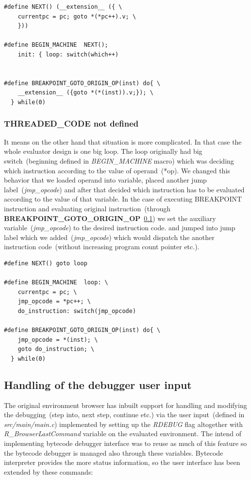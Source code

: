 \documentclass[thesis=M,english]{FITthesis}[2018/10/20]
\begin{document}
\begin{lstlisting}
#define NEXT() (__extension__ ({ \
    currentpc = pc; goto *(*pc++).v; \
    }))

#define BEGIN_MACHINE  NEXT(); 
    init: { loop: switch(which++)


#define BREAKPOINT_GOTO_ORIGIN_OP(inst) do{ \
    __extension__ ({goto *(*(inst)).v;}); \
  } while(0)
\end{lstlisting}


\subsubsection{THREADED{\_}CODE not defined}
It means on the other hand that situation is more complicated. In that case the whole evaluator design is one big loop. The loop originally had big switch~(beginning defined in \textit{BEGIN{\_}MACHINE} macro) which was deciding which instruction according to the value of operand~(*op). We changed this behavior that we loaded operand into variable, placed another jump label~(\textit{jmp{\_}opcode}) and after that decided which instruction has to be evaluated according to the value of that variable. In the case of executing BREAKPOINT instruction and evaluating original instruction~(through \textbf{BREAKPOINT{\_}GOTO{\_}ORIGIN{\_}OP}~\ref{}) we set the auxiliary variable~(\textit{jmp{\_}opcode}) to the desired instruction code.  and jumped into jump label which we added~(\textit{jmp{\_}opcode}) which would dispatch the another instruction code~(without increasing program count pointer etc.).

\begin{lstlisting}
#define NEXT() goto loop

#define BEGIN_MACHINE  loop: \
    currentpc = pc; \
    jmp_opcode = *pc++; \
    do_instruction: switch(jmp_opcode)

#define BREAKPOINT_GOTO_ORIGIN_OP(inst) do{ \
    jmp_opcode = *(inst); \
    goto do_instruction; \
  } while(0)
\end{lstlisting}

\subsection{Handling of the debugger user input}

The original environment browser has inbuilt support for handling and modifying the debugging~(step into, next step, continue etc.) via the user input~(defined in \textit{src/main/main.c}) implemented by setting up the \textit{RDEBUG} flag altogether with \textit{R{\_}BrowserLastCommand} variable on the evaluated environment. The intend of implementing bytecode debugger interface was to reuse as much of this feature so the bytecode debugger is managed also through these variables. Bytecode interpreter provides the more status information, so the user interface has been extended by these commands:
\end{document}
